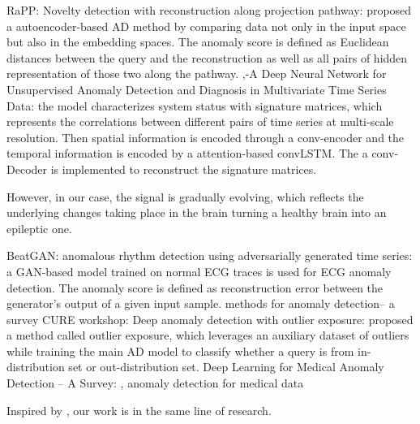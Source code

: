 \documentclass[pmlr]{jmlr}%
\begin{document}
\cite{kim2019rapp} RaPP: Novelty detection with reconstruction along projection pathway: proposed a autoencoder-based AD method by comparing data not only in the input space but also in the embedding spaces. The anomaly score is defined as Euclidean distances between the query and the reconstruction as well as all pairs of hidden representation of those two along the pathway.
\cite{zhang2019deep},-A Deep Neural Network for Unsupervised Anomaly Detection and Diagnosis in Multivariate Time Series Data: the model characterizes system status with signature matrices, which represents the correlations between different pairs of time series at multi-scale resolution. Then spatial information is encoded through a conv-encoder and the temporal information is encoded by a attention-based convLSTM. The a conv-Decoder is implemented to reconstruct the signature matrices.









However, in our case, the signal is gradually evolving, which reflects the underlying changes taking place in the brain turning a healthy brain into an epileptic one. 











\cite{zhou2019beatgan} BeatGAN: anomalous rhythm detection using adversarially generated time series: a GAN-based model trained on normal ECG traces is used for ECG anomaly detection. The anomaly score is defined as reconstruction error between the generator's output of a given input sample.
\cite{kalinichenko2014methods} methods for anomaly detection-- a survey CURE workshop:	
\cite{hendrycks2018deep} Deep anomaly detection with outlier exposure: proposed a method called outlier exposure, which leverages an auxiliary dataset of outliers while training the main AD model to classify whether a query is from in-distribution set or out-distribution set.
\cite{2020Deep} Deep Learning for Medical Anomaly Detection -- A Survey: , 
\cite{Salem2013SensorFA} anomaly detection for medical data 


Inspired by \cite{makhzani2015adversarial}, our work is in the same line of research.
\end{document}
